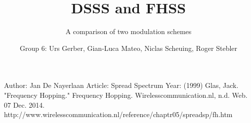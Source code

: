 \documentclass{llncs}
\begin{document}
\title{DSSS and FHSS}


\subtitle{A comparison of two modulation schemes}


\author{Group 6: Urs Gerber, Gian-Luca Mateo, Niclas Scheuing, Roger Stebler} 







\maketitle







\begin{appendix}
	
\end{appendix}




%
%

\begin{thebibliography}{1}
Author: Jan De Nayerlaan
Article: Spread Spectrum
Year: (1999) 
Glas, Jack. "Frequency Hopping." Frequency Hopping. Wirelesscommunication.nl, n.d. Web. 07 Dec. 2014. http://www.wirelesscommunication.nl/reference/chaptr05/spreadsp/fh.htm
\end{thebibliography}
\end{document}
